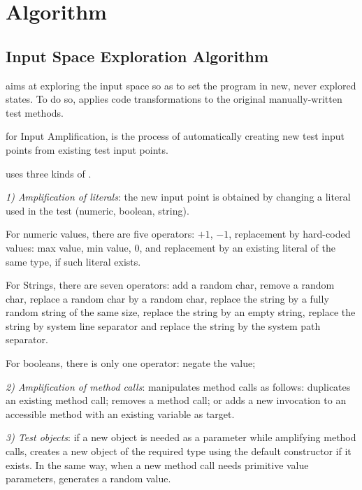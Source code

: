 \section{Algorithm}
\label{sec:dspot:algorithm}
\subsection{Input Space Exploration Algorithm}
\label{subsec:dspot:algorithm:input-space-exploration}

\dspot aims at exploring the input space so as to set the program in new, never explored states. To do so, \dspot applies code transformations to the original manually-written test methods. 

\textbf{\Iampl} for Input Amplification, is the process of automatically creating new test input points from existing test input points.

\dspot uses three kinds of \Iampl.

\emph{1) Amplification of literals}: the new input point is obtained by changing a literal used in the test (numeric, boolean, string).

For numeric values, there are five operators: 
$+1$,
$-1$,
replacement by hard-coded values: max value,
min value,
0, 
and replacement by an existing literal of the same type, if such literal exists.

For Strings, there are seven operators: 
add a random char, 
remove a random char, 
replace a random char by a random char, 
replace the string by a fully random string of the same size, 
replace the string by an empty string, 
replace the string by system line separator 
and replace the string by the system path separator.

For booleans, there is only one operator: negate the value;

\emph{2) Amplification of method calls}: \dspot manipulates method calls as follows:
\dspot duplicates an existing method call; removes a method call;
or adds a new invocation to an accessible method with an existing variable as target.

\emph{3) Test objects}:
if a new object is needed as a parameter while amplifying method calls, \dspot creates a new object of the required type using the default constructor if it exists.
In the same way, when a new method call needs primitive value parameters, \dspot generates a random value.

